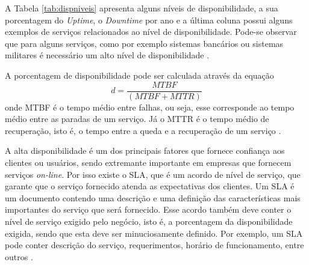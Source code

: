 A Tabela \ref{tab:dispniveis} apresenta alguns níveis de disponibilidade, a sua porcentagem do \textit{Uptime}, o \textit{Downtime} por ano 
e a última coluna possui alguns exemplos de serviços relacionados ao nível de disponibilidade. Pode-se observar que para alguns serviços, 
como por exemplo sistemas bancários ou sistemas militares é necessário um alto nível de disponibilidade \cite{pereirafilho2004}.

A porcentagem de disponibilidade pode ser calculada através da equação
\begin{equation}
d = \frac{MTBF}{(MTBF + MTTR)}
\label{disponibilidade}
\end{equation}
onde \ac{MTBF} é o tempo médio entre falhas, ou seja, esse corresponde ao tempo médio entre as paradas de um serviço. Já o \ac{MTTR} é o 
tempo médio de recuperação, isto é, o tempo entre a queda e a recuperação de um serviço \cite{goncalves2009}.

A alta disponibilidade é um dos principais fatores que fornece confiança aos clientes ou usuários, sendo extremante importante 
em empresas que fornecem serviços \textit{on-line}. Por isso existe o \ac{SLA}, que é um acordo de nível de serviço, que garante que 
o serviço fornecido atenda as expectativas dos clientes. Um \ac{SLA} é um documento contendo uma descrição e uma definição das 
características mais importantes do serviço que será fornecido. Esse acordo também deve conter o nível de serviço exigido pelo negócio, 
isto é, a porcentagem da disponibilidade exigida, sendo que esta deve ser minuciosamente definido. Por exemplo, um \ac{SLA} pode conter 
descrição do serviço, requerimentos, horário de funcionamento, entre outros \cite{smith2010}.
